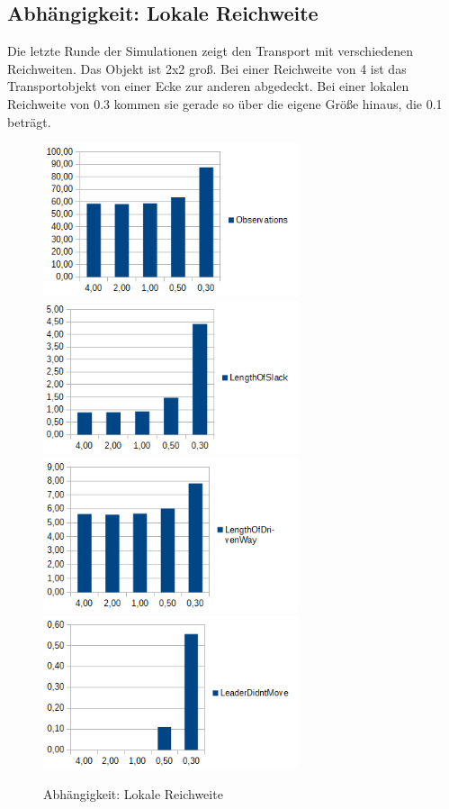 \subsection*{Abhängigkeit: Lokale Reichweite}

Die letzte Runde der Simulationen zeigt den Transport mit verschiedenen Reichweiten. Das Objekt ist 2x2 groß. Bei einer Reichweite von 4 ist das Transportobjekt von einer Ecke zur anderen abgedeckt. Bei einer lokalen Reichweite von 0.3 kommen sie gerade so über die eigene Größe hinaus, die 0.1 beträgt.

\begin{figure}[h]
	\includegraphics[width=7.5cm,keepaspectratio]{graphics/Statistics/Transport/Range_Observations.png}
	\includegraphics[width=7.5cm,keepaspectratio]{graphics/Statistics/Transport/Range_Slack.png}
	\includegraphics[width=7.5cm,keepaspectratio]{graphics/Statistics/Transport/Range_Way.png}
	\includegraphics[width=7.5cm,keepaspectratio]{graphics/Statistics/Transport/Range_Move.png}
	\caption{Abhängigkeit: Lokale Reichweite}
	\label{pic:TransportRange}
\end{figure}

